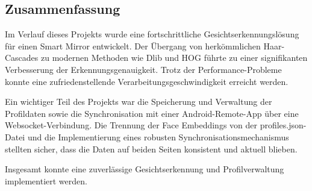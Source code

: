 \subsection{Zusammenfassung}
Im Verlauf dieses Projekts wurde eine fortschrittliche Gesichtserkennungslösung für einen Smart Mirror entwickelt. Der Übergang von herkömmlichen Haar-Cascades zu modernen Methoden wie Dlib und HOG führte zu einer signifikanten Verbesserung der Erkennungsgenauigkeit. Trotz der Performance-Probleme konnte eine zufriedenstellende Verarbeitungsgeschwindigkeit erreicht werden.

Ein wichtiger Teil des Projekts war die Speicherung und Verwaltung der Profildaten sowie die Synchronisation mit einer Android-Remote-App über eine Websocket-Verbindung. Die Trennung der Face Embeddings von der profiles.json-Datei und die Implementierung eines robusten Synchronisationsmechanismus stellten sicher, dass die Daten auf beiden Seiten konsistent und aktuell blieben.

Insgesamt konnte eine zuverlässige Gesichtserkennung und Profilverwaltung implementiert werden.
